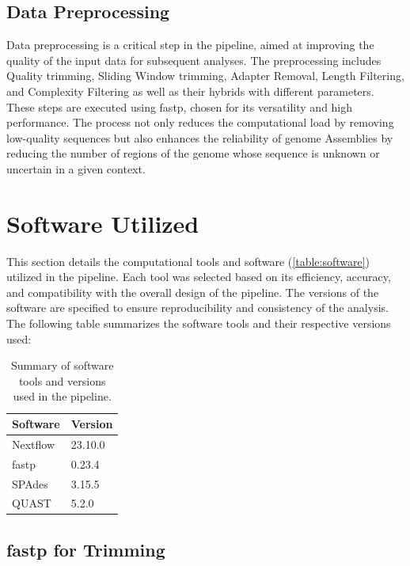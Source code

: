 \subsection{Data Preprocessing}

Data preprocessing is a critical step in the pipeline, aimed at improving the quality of the input data for subsequent analyses. The preprocessing includes Quality \gls{trimming}, Sliding Window \gls{trimming}, Adapter Removal, Length Filtering, and Complexity Filtering as well as their hybrids with different parameters. These steps are executed using fastp, chosen for its versatility and high performance. The process not only reduces the computational load by removing low-quality sequences but also enhances the reliability of \gls{genome} Assemblies by reducing the number of regions of the \gls{genome} whose sequence is unknown or uncertain in a given context.



\section{Software Utilized}

This section details the computational tools and software (\autoref{table:software}) utilized in the pipeline. Each tool was selected based on its efficiency, accuracy, and compatibility with the overall design of the pipeline. The versions of the software are specified to ensure reproducibility and consistency of the analysis. The following table summarizes the software tools and their respective versions used:

\begin{table}[ht]
\centering
\begin{tabular}{l l}
\hline
\textbf{Software} & \textbf{Version} \\ \hline
Nextflow & 23.10.0 \\
fastp & 0.23.4 \\
SPAdes & 3.15.5 \\
QUAST & 5.2.0 \\ \hline
\end{tabular}
\caption{Summary of software tools and versions used in the pipeline.}
\label{table:software}
\end{table}

\subsection{fastp for Trimming}

